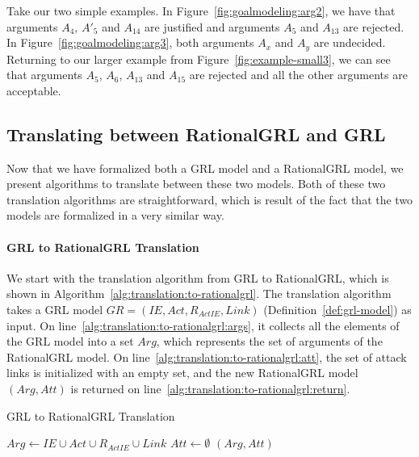 Take our two simple examples. In Figure~\ref{fig:goalmodeling:arg2}, we have that arguments $A_4$, $A'_5$ and $A_{14}$ are justified and arguments $A_5$ and $A_{13}$ are rejected. In Figure~\ref{fig:goalmodeling:arg3}, both arguments $A_x$ and $A_y$ are undecided. Returning to our larger example from Figure~\ref{fig:example-small3}, we can see that arguments $A_5$, $A_6$, $A_{13}$ and $A_{15}$ are rejected and all the other arguments are acceptable.

\subsection{Translating between RationalGRL and GRL}
\label{sect:formalframework:translation}

Now that we have formalized both a GRL model and a RationalGRL model, we present algorithms to translate between these two models. Both of these two translation algorithms are straightforward, which is result of the fact that the two models are formalized in a very similar way.

\paragraph{GRL to RationalGRL Translation} We start with the translation algorithm from GRL to RationalGRL, which is shown in Algorithm~\ref{alg:translation:to-rationalgrl}. The translation algorithm takes a GRL model $GR=(IE, Act, R_{ActIE}, Link)$ (Definition~\ref{def:grl-model}) as input. On line~\ref{alg:translation:to-rationalgrl:args}, it collects all the elements of the GRL model into a set $Arg$, which represents the set of arguments of the RationalGRL model. On line~\ref{alg:translation:to-rationalgrl:att}, the set of attack links is initialized with an empty set, and the new RationalGRL model $(Arg, Att)$ is returned on line~\ref{alg:translation:to-rationalgrl:return}.

\begin{algorithm}[t]
  \caption{GRL to RationalGRL Translation}
  \label{alg:translation:to-rationalgrl}
  \begin{algorithmic}[1]
    \State $Arg \leftarrow IE\cup Act \cup R_{ActIE}\cup Link$\label{alg:translation:to-rationalgrl:args}
    \State $Att \leftarrow \emptyset$\label{alg:translation:to-rationalgrl:att}
    \State \Return $(Arg, Att)$\label{alg:translation:to-rationalgrl:return}
    \EndProcedure
  \end{algorithmic}
\end{algorithm}

